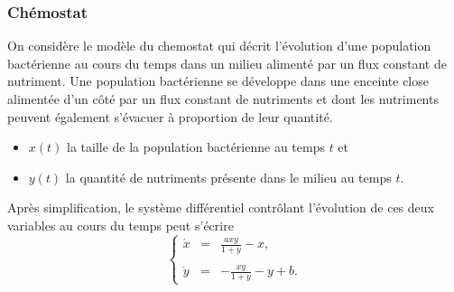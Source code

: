 \subsubsection{Chémostat}


On considère le modèle du chemostat qui décrit l'évolution d'une population bactérienne au cours du temps dans un milieu alimenté par un flux constant de nutriment. Une population bactérienne se développe dans une enceinte close alimentée d'un côté par un flux constant de nutriments et dont les nutriments peuvent également s'évacuer à proportion de leur quantité.
\begin{itemize}
  \item $x(t)$ la taille de la population bactérienne au temps $t$ et
  \item $y(t)$ la quantité de nutriments présente dans le milieu au temps $t$.
\end{itemize}
Après simplification, le système différentiel contrôlant l'évolution de ces deux variables au cours du temps peut s'écrire
$$
\left\{\begin{array}{rcl} 
        \dot x & = & \displaystyle{\frac{a x y}{1 + y} - x}, \\
        \\
        \dot y & = & \displaystyle{- \frac{x y}{1 + y} - y + b}. 
       \end{array}
\right.
$$

